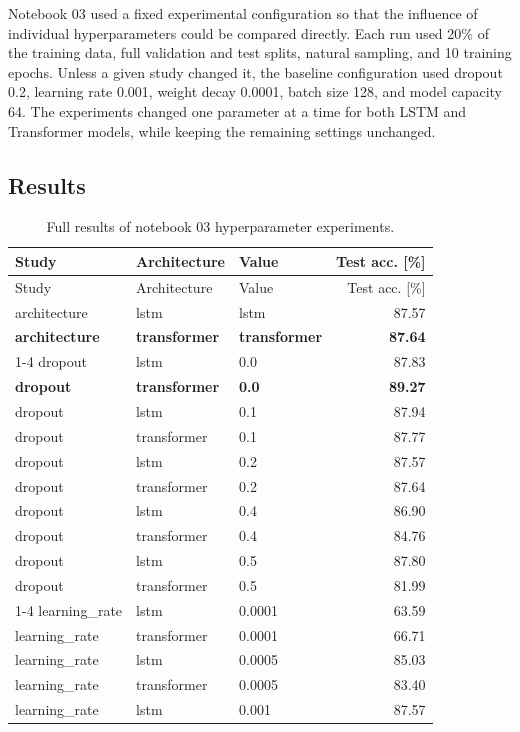 \documentclass[14pt]{article}
\begin{document}
Notebook 03 used a fixed experimental configuration so that the influence of individual hyperparameters could be compared directly. Each run used 20\% of the training data, full validation and test splits, natural sampling, and 10 training epochs. Unless a given study changed it, the baseline configuration used dropout 0.2, learning rate 0.001, weight decay 0.0001, batch size 128, and model capacity 64. The experiments changed one parameter at a time for both LSTM and Transformer models, while keeping the remaining settings unchanged.

\subsection{Results}
\small
\begin{longtable}{lllr}
\caption{Full results of notebook 03 hyperparameter experiments.}
\label{tab:hyperparameter-full}\\
\toprule
Study & Architecture & Value & Test acc. [\%] \\
\midrule
\endfirsthead
\toprule
Study & Architecture & Value & Test acc. [\%] \\
\midrule
\endhead
architecture & lstm & lstm & 87.57 \\
\textbf{architecture} & \textbf{transformer} & \textbf{transformer} & \textbf{87.64} \\
\cmidrule(lr){1-4}
dropout & lstm & 0.0 & 87.83 \\
\textbf{dropout} & \textbf{transformer} & \textbf{0.0} & \textbf{89.27} \\
dropout & lstm & 0.1 & 87.94 \\
dropout & transformer & 0.1 & 87.77 \\
dropout & lstm & 0.2 & 87.57 \\
dropout & transformer & 0.2 & 87.64 \\
dropout & lstm & 0.4 & 86.90 \\
dropout & transformer & 0.4 & 84.76 \\
dropout & lstm & 0.5 & 87.80 \\
dropout & transformer & 0.5 & 81.99 \\
\cmidrule(lr){1-4}
learning\_rate & lstm & 0.0001 & 63.59 \\
learning\_rate & transformer & 0.0001 & 66.71 \\
learning\_rate & lstm & 0.0005 & 85.03 \\
learning\_rate & transformer & 0.0005 & 83.40 \\
learning\_rate & lstm & 0.001 & 87.57 \\

\end{longtable}
\end{document}
